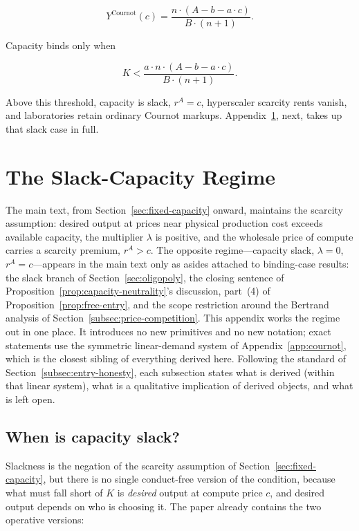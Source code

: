 \documentclass[11pt]{article}
\begin{document}
\begin{equation}Y^{\mathrm{Cournot}}(c)=\frac{n\cdot(A-b-a\cdot c)}{B\cdot(n+1)}.\end{equation}

Capacity binds only when

\begin{equation}\label{eq:cournot-slack-threshold}K<\frac{a\cdot n\cdot(A-b-a\cdot c)}{B\cdot(n+1)}.\end{equation}

Above this threshold, capacity is slack, $r^A=c$, hyperscaler scarcity rents vanish, and laboratories retain ordinary Cournot markups. Appendix~\ref{app:slack-capacity}, next, takes up that slack case in full.

\section{The Slack-Capacity Regime}
\label{app:slack-capacity}

The main text, from Section~\ref{sec:fixed-capacity} onward, maintains the scarcity assumption: desired output at prices near physical production cost exceeds available capacity, the multiplier $\lambda$ is positive, and the wholesale price of compute carries a scarcity premium, $r^A>c$. The opposite regime---capacity slack, $\lambda=0$, $r^A=c$---appears in the main text only as asides attached to binding-case results: the slack branch of Section~\ref{sec:oligopoly}, the closing sentence of Proposition~\ref{prop:capacity-neutrality}'s discussion, part~(4) of Proposition~\ref{prop:free-entry}, and the scope restriction around the Bertrand analysis of Section~\ref{subsec:price-competition}. This appendix works the regime out in one place. It introduces no new primitives and no new notation; exact statements use the symmetric linear-demand system of Appendix~\ref{app:cournot}, which is the closest sibling of everything derived here. Following the standard of Section~\ref{subsec:entry-honesty}, each subsection states what is derived (within that linear system), what is a qualitative implication of derived objects, and what is left open.

\subsection{When is capacity slack?}
\label{subsec:slack-condition}

Slackness is the negation of the scarcity assumption of Section~\ref{sec:fixed-capacity}, but there is no single conduct-free version of the condition, because what must fall short of $K$ is \emph{desired} output at compute price $c$, and desired output depends on who is choosing it. The paper already contains the two operative versions:
\end{document}
